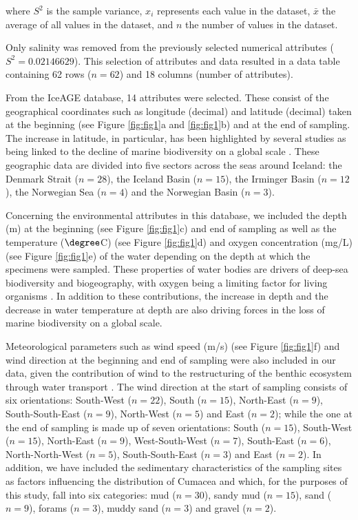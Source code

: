where $S^2$ is the sample variance, $x_i$ represents each value in the dataset, $\bar{x}$ the average of all values in the dataset, and $n$ the number of values in the dataset.

Only salinity was removed from the previously selected numerical attributes ($S^2 = 0.02146629$). This selection of attributes and data resulted in a data table containing 62 rows ($n=62$) and 18 columns (number of attributes). 

From the IceAGE database, 14 attributes were selected. These consist of the geographical coordinates such as longitude (decimal) and latitude (decimal) taken at the beginning (see Figure \ref{fig:fig1}a and \ref{fig:fig1}b) and at the end of sampling. The increase in latitude, in particular, has been highlighted by several studies as being linked to the decline of marine biodiversity on a global scale \citep{lambshead_latitudinal_2000,gage_diversity_2004}. These geographic data are divided into five sectors across the seas around Iceland: the Denmark Strait ($n=28$), the Iceland Basin ($n=15$), the Irminger Basin ($n=12$), the Norwegian Sea ($n=4$) and the Norwegian Basin ($n=3$). 

Concerning the environmental attributes in this database, we included the depth (m) at the beginning (see Figure \ref{fig:fig1}c) and end of sampling as well as the temperature ($\degree$C) (see Figure \ref{fig:fig1}d) and oxygen concentration (mg/L) (see Figure \ref{fig:fig1}e) of the water depending on the depth at which the specimens were sampled. These properties of water bodies are drivers of deep-sea biodiversity and biogeography, with oxygen being a limiting factor for living organisms \citep{keeling_ocean_2010}. In addition to these contributions, the increase in depth \citep{rex_global_2006,costello_marine_2017} and the decrease in water temperature at depth \citep{lambshead_latitudinal_2000} are also driving forces in the loss of marine biodiversity on a global scale.

Meteorological parameters such as wind speed (m/s) (see Figure \ref{fig:fig1}f) and wind direction at the beginning and end of sampling were also included in our data, given the contribution of wind to the restructuring of the benthic ecosystem through water transport \citep{waga_recent_2020,saeedi_environmental_2022}. The wind direction at the start of sampling consists of six orientations: South-West ($n=22$), South ($n=15$), North-East ($n=9$), South-South-East ($n=9$), North-West ($n=5$) and East ($n=2$); while the one at the end of sampling is made up of seven orientations: South ($n=15$), South-West ($n=15$), North-East ($n=9$), West-South-West ($n=7$), South-East ($n=6$), North-North-West ($n=5$), South-South-East ($n=3$) and East ($n=2$). In addition, we have included the sedimentary characteristics of the sampling sites as factors influencing the distribution of Cumacea \citep{uhlir_adding_2021} and which, for the purposes of this study, fall into six categories: mud ($n=30$), sandy mud ($n=15$), sand ($n=9$), forams ($n=3$), muddy sand ($n=3$) and gravel ($n=2$).

